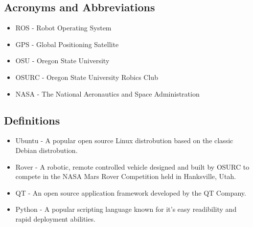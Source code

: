 \subsection{Acronyms and Abbreviations}
\begin{itemize}
\item ROS - Robot Operating System
\item GPS - Global Positioning Satellite
\item OSU - Oregon State University
\item OSURC - Oregon State University Robics Club
\item NASA - The National Aeronautics and Space Administration
\end{itemize}


\subsection{Definitions}
\begin{itemize}
\item Ubuntu - A popular open source Linux distrobution based on the classic Debian distrobution.
\item Rover - A robotic, remote controlled vehicle designed and built by OSURC to compete in the NASA Mars Rover Competition held in Hanksville, Utah.
\item QT - An open source application framework developed by the QT Company.
\item Python - A popular scripting language known for it's easy readibility and rapid deployment abilities.
\end{itemize}
